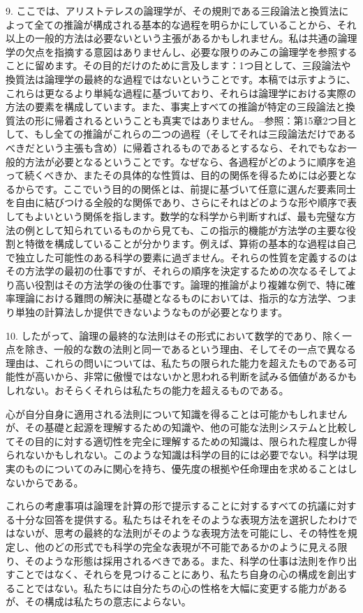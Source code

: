 \documentclass[a4paper,11pt,openany]{ltjsbook}
\begin{document}
9. ここでは、アリストテレスの論理学が、その規則である三段論法と換質法によって全ての推論が構成される基本的な過程を明らかにしていることから、それ以上の一般的方法は必要ないという主張があるかもしれません。私は共通の論理学の欠点を指摘する意図はありませんし、必要な限りのみこの論理学を参照することに留めます。その目的だけのために言及します：1つ目として、三段論法や換質法は論理学の最終的な過程ではないということです。本稿では示すように、これらは更なるより単純な過程に基づいており、それらは論理学における実際の方法の要素を構成しています。また、事実上すべての推論が特定の三段論法と換質法の形に帰着されるということも真実ではありません。--参照：第15章2つ目として、もし全ての推論がこれらの二つの過程（そしてそれは三段論法だけであるべきだという主張も含め）に帰着されるものであるとするなら、それでもなお一般的方法が必要となるということです。なぜなら、各過程がどのように順序を追って続くべきか、またその具体的な性質は、目的の関係を得るためには必要となるからです。ここでいう目的の関係とは、前提に基づいて任意に選んだ要素同士を自由に結びつける全般的な関係であり、さらにそれはどのような形や順序で表してもよいという関係を指します。数学的な科学から判断すれば、最も完璧な方法の例として知られているものから見ても、この指示的機能が方法学の主要な役割と特徴を構成していることが分かります。例えば、算術の基本的な過程は自己で独立した可能性のある科学の要素に過ぎません。それらの性質を定義するのはその方法学の最初の仕事ですが、それらの順序を決定するための次なるそしてより高い役割はその方法学の後の仕事です。論理的推論がより複雑な例で、特に確率理論における難問の解決に基礎となるものにおいては、指示的な方法学、つまり単独の計算法しか提供できないようなものが必要となります。

10. したがって、論理の最終的な法則はその形式において数学的であり、除く一点を除き、一般的な数の法則と同一であるという理由、そしてその一点で異なる理由は、これらの問いについては、私たちの限られた能力を超えたものである可能性が高いから、非常に傲慢ではないかと思われる判断を試みる価値があるかもしれない。おそらくそれらは私たちの能力を超えるものである。

心が自分自身に適用される法則について知識を得ることは可能かもしれませんが、その基礎と起源を理解するための知識や、他の可能な法則システムと比較してその目的に対する適切性を完全に理解するための知識は、限られた程度しか得られないかもしれない。このような知識は科学の目的には必要でない。科学は現実のものについてのみに関心を持ち、優先度の根拠や任命理由を求めることはしないからである。

これらの考慮事項は論理を計算の形で提示することに対するすべての抗議に対する十分な回答を提供する。私たちはそれをそのような表現方法を選択したわけではないが、思考の最終的な法則がそのような表現方法を可能にし、その特性を規定し、他のどの形式でも科学の完全な表現が不可能であるかのように見える限り、そのような形態は採用されるべきである。また、科学の仕事は法則を作り出すことではなく、それらを見つけることにあり、私たち自身の心の構成を創出することではない。私たちには自分たちの心の性格を大幅に変更する能力があるが、その構成は私たちの意志によらない。
\end{document}
